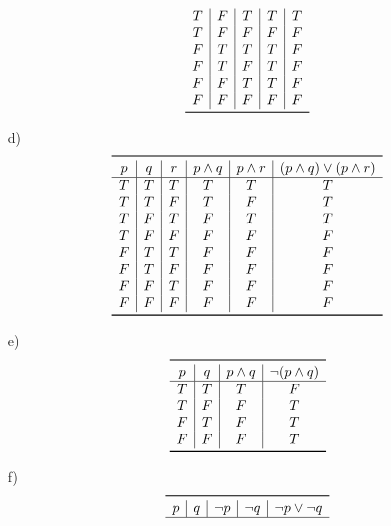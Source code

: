 \documentclass{article}
\begin{document}
\begin{itemize}
\[\begin{array}{c|c|c|c|c}
                T & F & T & T & T \\
                T & F & F & F & F \\
                F & T & T & T & F \\
                F & T & F & T & F \\
                F & F & T & T & F \\
                F & F & F & F & F \\
                \bottomrule
            \end{array}
        \]
    \item[d)]
        \[
            \begin{array}{c|c|c|c|c|c}
                \toprule
                p & q & r & p \land q & p \land r & (p \land q) \lor (p \land r) \\
                \hline
                T & T & T & T & T & T \\
                T & T & F & T & F & T \\
                T & F & T & F & T & T \\
                T & F & F & F & F & F \\
                F & T & T & F & F & F \\
                F & T & F & F & F & F \\
                F & F & T & F & F & F \\
                F & F & F & F & F & F \\
                \bottomrule
            \end{array}
        \]
    \item[e)]
        \[
            \begin{array}{c|c|c|c}
                \toprule
                p & q & p \land q & \neg(p \land q) \\
                \hline
                T & T & T & F \\
                T & F & F & T \\
                F & T & F & T \\
                F & F & F & T \\
                \bottomrule
            \end{array}
        \]
    \item[f)]
        \[
            \begin{array}{c|c|c|c|c}
                \toprule
                p & q & \neg p & \neg q & \neg p \lor \neg q \\
                \hline

\end{array}\]
\end{itemize}
\end{document}
